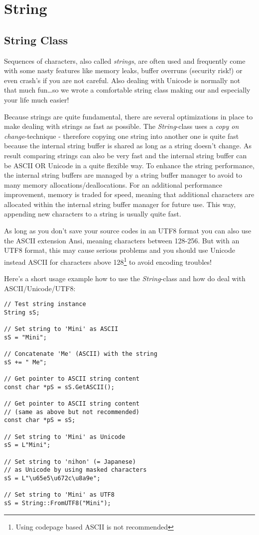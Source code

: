 \section{String}




\subsection{String Class}
Sequences of characters, also called \emph{strings}, are often used and frequently come with some nasty features like memory leaks, buffer overruns (security risk!) or even crash's if you are not careful. Also dealing with Unicode is normally not that much fun\ldots so we wrote a comfortable string class making our and especially your life much easier!

Because strings are quite fundamental, there are several optimizations in place to make dealing with strings as fast as possible. The \emph{String}-class uses a \emph{copy on change}-technique - therefore copying one string into another one is quite fast because the internal string buffer is shared as long as a string doesn't change. As result comparing strings can also be very fast and the internal string buffer can be ASCII OR Unicode in a quite flexible way. To enhance the string performance, the internal string buffers are managed by a string buffer manager to avoid to many memory allocations/deallocations. For an additional performance improvement, memory is traded for speed, meaning that additional characters are allocated within the internal string buffer manager for future use. This way, appending new characters to a string is usually quite fast.

As long as you don't save your source codes in an UTF8 format you can also use the ASCII extension Ansi, meaning characters between 128-256. But with an UTF8 format, this may cause serious problems and you should use Unicode instead ASCII for characters above 128\footnote{Using codepage based ASCII is not recommended} to avoid encoding troubles!

Here's a short usage example how to use the \emph{String}-class and how do deal with ASCII/Unicode/UTF8:

\begin{lstlisting}[caption=ASCII/Unicode/UTF8 string example]
// Test string instance
String sS;

// Set string to 'Mini' as ASCII
sS = "Mini";

// Concatenate 'Me' (ASCII) with the string
sS += " Me";

// Get pointer to ASCII string content
const char *pS = sS.GetASCII();

// Get pointer to ASCII string content
// (same as above but not recommended)
const char *pS = sS;

// Set string to 'Mini' as Unicode
sS = L"Mini";

// Set string to 'nihon' (= Japanese)
// as Unicode by using masked characters
sS = L"\u65e5\u672c\u8a9e";

// Set string to 'Mini' as UTF8
sS = String::FromUTF8("Mini");
\end{lstlisting}

